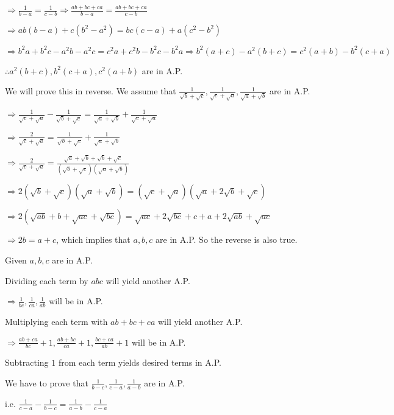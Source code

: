   $\Rightarrow \frac{1}{b - a} = \frac{1}{c - b} \Rightarrow \frac{ab + bc + ca}{b - a} = \frac{ab + bc + ca}{c - b}$

  $\Rightarrow ab(b - a) + c(b^2 - a^2) = bc(c - a) + a(c^2 - b^2)$

  $\Rightarrow b^2a + b^2c - a^2b - a^2c = c^2a + c^2b - b^2c - b^2a \Rightarrow b^2(a + c) - a^2(b + c) = c^2(a + b) - b^2(c + a)$

  $\therefore a^2(b + c), b^2(c + a), c^2(a + b)$ are in A.P.
\item We will prove this in reverse. We assume that $\frac{1}{\sqrt{b} + \sqrt{c}}, \frac{1}{\sqrt{c} + \sqrt{a}},
  \frac{1}{\sqrt{a} + \sqrt{b}}$ are in A.P.

  $\Rightarrow \frac{1}{\sqrt{c} + \sqrt{a}} - \frac{1}{\sqrt{b} + \sqrt{c}} = \frac{1}{\sqrt{a} + \sqrt{b}} +
  \frac{1}{\sqrt{c} + \sqrt{a}}$

  $\Rightarrow \frac{2}{\sqrt{c} + \sqrt{a}} = \frac{1}{\sqrt{b} + \sqrt{c}} + \frac{1}{\sqrt{a} + \sqrt{b}}$

  $\Rightarrow \frac{2}{\sqrt{c} + \sqrt{a}} = \frac{\sqrt{a} + \sqrt{b} + \sqrt{b} + \sqrt{c}}{(\sqrt{b} + \sqrt{c})(\sqrt{a}
    + \sqrt{b})}$

  $\Rightarrow 2(\sqrt{b} + \sqrt{c})(\sqrt{a} + \sqrt{b}) = (\sqrt{c} + \sqrt{a})(\sqrt{a} + 2\sqrt{b} + \sqrt{c})$

  $\Rightarrow 2(\sqrt{ab} + b + \sqrt{ac} + \sqrt{bc}) = \sqrt{ac} + 2\sqrt{bc} + c + a + 2\sqrt{ab} + \sqrt{ac}$

  $\Rightarrow 2b = a + c$, which implies that $a, b, c$ are in A.P. So the reverse is also true.
\item Given $a, b, c$ are in A.P.

  Dividing each term by $abc$ will yield another A.P.

  $\Rightarrow \frac{1}{bc}, \frac{1}{ca}, \frac{1}{ab}$ will be in A.P.

  Multiplying each term with $ab + bc + ca$ will yield another A.P.

  $\Rightarrow \frac{ab + ca}{bc} + 1, \frac{ab + bc}{ca} + 1, \frac{bc + ca}{ab} + 1$ will be in A.P.

  Subtracting $1$ from each term yields desired terms in A.P.
\item We have to prove that $\frac{1}{b - c}, \frac{1}{c - a}, \frac{1}{a - b}$ are in A.P.

  i.e. $\frac{1}{c - a} - \frac{1}{b - c} = \frac{1}{a - b} - \frac{1}{c - a}$

